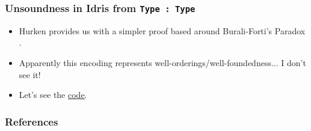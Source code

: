 \documentclass[hyperref={colorlinks = true,linkcolor = blue, citecolor = blue, urlcolor = blue}]{beamer}
\begin{document}
\begin{frame}[fragile]
  \frametitle{Unsoundness in Idris from \texttt{Type : Type}}
  \begin{itemize}
    \item Hurken provides us with a simpler proof based around Burali-Forti's
          Paradox \citet{hurkens1995simplification}. 
    \item Apparently this encoding represents well-orderings/well-foundedness...
          I don't see it!
    \item Let's see the \href{https://github.com/donovancrichton/ANU-TT/blob/master/RusselVsTarskiUniverses/Code/src/HurkensParadoxLoop.idr}{code}.
  \end{itemize}
\end{frame}

\begin{frame}[fragile]
\frametitle{References}
{}
\end{frame}
\end{document}
